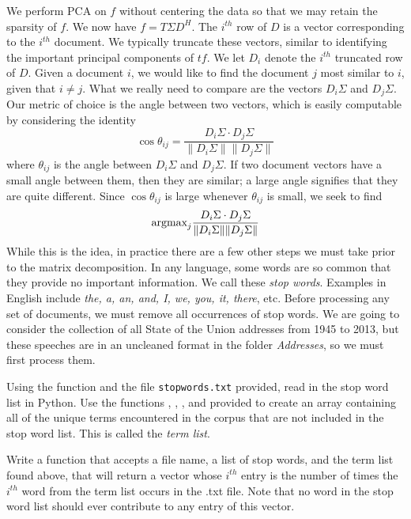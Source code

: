 We perform PCA on $f$ without centering the data so that we may retain the sparsity of $f$. We now have $f = T\Sigma D^{H}$. The $i^{th}$ row of $D$ is a vector corresponding to the $i^{th}$ document. We typically truncate these vectors, similar to identifying the important principal components of $t\!f$. We let $D_{i}$ denote the $i^{th}$ truncated row of $D$. Given a document $i$, we would like to find the document $j$ most similar to $i$, given that $i\neq j$. What we really need to compare are the vectors $D_{i}\Sigma$ and $D_{j}\Sigma$. Our metric of choice is the angle between two vectors, which is easily computable by considering the identity 
\begin{equation*}
\cos \theta_{ij} = \frac{D_{i}\Sigma \cdot D_{j}\Sigma}{\|D_{i}\Sigma\| \|D_{j}\Sigma\|}
\end{equation*}
where $\theta_{ij}$ is the angle between $D_{i}\Sigma$ and $D_{j}\Sigma$. If two document vectors have a small angle between them, then they are similar; a large angle signifies that they are quite different. Since $\cos \theta_{ij}$ is large whenever $\theta_{ij}$ is small, we seek to find 
\begin{equation*}
\mbox{argmax}_{j} \frac{D_{i}\Sigma \cdot D_{j}\Sigma}{\|D_{i}\Sigma\| \|D_{j}\Sigma\|}
\end{equation*}
While this is the idea, in practice there are a few other steps we must take prior to the matrix decomposition. In any language, some words are so common that they provide no important information. We call these \emph{stop words}. Examples in English include \emph{the, a, an, and, I, we, you, it, there}, etc. Before processing any set of documents, we must remove all occurrences of stop words. We are going to consider the collection of all State of the Union addresses from 1945 to 2013, but these speeches are in an uncleaned format in the folder \emph{Addresses}, so we must first process them.

\begin{problem}
Using the function  and the file 
\texttt{stopwords.txt} provided, read in the stop word list in Python. 
Use the functions , , , 
and  provided to create an array containing all of the unique 
terms encountered in the corpus that are not included in the stop word list. 
This is called the \emph{term list}.
\end{problem}

\begin{problem}
Write a function that accepts a file name, a list of stop words, and the term list 
found above, that will return a vector whose $i^{th}$ entry is the number of 
times the $i^{th}$ word from the term list occurs in the .txt file. 
Note that no word in the stop word list should ever contribute to any entry of this vector.
\end{problem}

